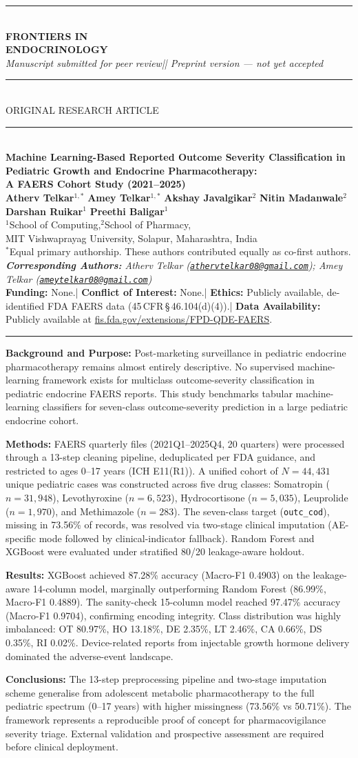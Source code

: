 \documentclass[10pt,twocolumn]{article}
\makeatletter
\newcommand{\FAERS}{\textsf{FAERS}\xspace}
\def\@maketitle{%
\newpage
\begin{center}
\leavevmode
{\color{jpbiBlue}\rule{\textwidth}{2pt}}\\[0.5pt]
{\Large\bfseries\color{jpbiBlue}
  FRONTIERS IN\\
  ENDOCRINOLOGY}\\[0pt]
{\small\itshape\color{jpbiMid}
  Manuscript submitted for peer review\enspace|\enspace
  2026\enspace|\enspace
  Preprint version --- not yet accepted}\\[0.5pt]
{\color{jpbiBlue}\rule{\textwidth}{0.5pt}}\\[0.5pt]
{\footnotesize\color{jpbiAccent}
  \MakeUppercase{Original Research Article}}\\[0.5pt]
{\color{jpbiBlue}\rule{\textwidth}{0.5pt}}\\[1pt]
{\LARGE\bfseries\color{jpbiBlue}
  Machine Learning-Based Reported Outcome Severity Classification in\\
  Pediatric Growth and Endocrine Pharmacotherapy:\\
  A FAERS Cohort Study (2021--2025)}\\[2pt]
{\small
  \textbf{Atherv Telkar}$^{1,*}$\quad
  \textbf{Amey Telkar}$^{1,*}$\quad
  \textbf{Akshay Javalgikar}$^{2}$\quad
  \textbf{Nitin Madanwale}$^{2}$\quad
  \textbf{Darshan Ruikar}$^{1}$\quad
  \textbf{Preethi Baligar}$^{1}$}\\[2pt]
{\scriptsize
  $^{1}$School of Computing,\quad $^{2}$School of Pharmacy,\\
  MIT Vishwaprayag University, Solapur, Maharashtra, India\\[0pt]
  $^{*}$Equal primary authorship. These authors contributed
  equally as co-first authors.}\\[1pt]
{\scriptsize\itshape
  \textbf{Corresponding Authors:}\enspace
  Atherv Telkar
  (\href{mailto:athervtelkar08@gmail.com}
  {\texttt{athervtelkar08@gmail.com}});\quad
  Amey Telkar
  (\href{mailto:ameytelkar08@gmail.com}
  {\texttt{ameytelkar08@gmail.com}})}\\[2pt]
{\scriptsize\color{black!80}
  \textbf{Funding:} None.\quad|\quad
  \textbf{Conflict of Interest:} None.\quad|\quad
  \textbf{Ethics:} Publicly available, de-identified FDA \FAERS data (45\,CFR\,\S\,46.104(d)(4)).\quad|\quad
  \textbf{Data Availability:} Publicly available at \href{https://fis.fda.gov/extensions/FPD-QDE-FAERS/FPD-QDE-FAERS.html}{fis.fda.gov/extensions/FPD-QDE-FAERS}.}\\[1pt]
{\color{jpbiBlue}\rule{\textwidth}{1.5pt}}
\end{center}}
\makeatother
\begin{document}
 
\onecolumn
\enlargethispage{1.5cm}
\makeatletter\@maketitle\makeatother
 
\begin{tcolorbox}[absbox, title={Structured Abstract}, colbacktitle=jpbiBlue!8, coltitle=jpbiBlue, fonttitle=\small\bfseries\centering\MakeUppercase, toptitle=2pt, bottomtitle=2pt, top=1.5pt, bottom=1.5pt]
\footnotesize
\noindent\textbf{Background and Purpose:}
Post-marketing surveillance in pediatric endocrine pharmacotherapy remains almost entirely descriptive. No supervised machine-learning framework exists for multiclass outcome-severity classification in pediatric endocrine \FAERS reports. This study benchmarks tabular machine-learning classifiers for seven-class outcome-severity prediction in a large pediatric endocrine cohort.

\par\vspace{1.5pt}\noindent\textbf{Methods:}
\FAERS quarterly files (2021Q1--2025Q4, 20 quarters) were processed through a 13-step cleaning pipeline, deduplicated per FDA guidance, and restricted to ages 0--17 years (ICH E11(R1)). A unified cohort of $N = 44{,}431$ unique pediatric cases was constructed across five drug classes: Somatropin ($n = 31{,}948$), Levothyroxine ($n = 6{,}523$), Hydrocortisone ($n = 5{,}035$), Leuprolide ($n = 1{,}970$), and Methimazole ($n = 283$). The seven-class target (\texttt{outc\_cod}), missing in 73.56\% of records, was resolved via two-stage clinical imputation (AE-specific mode followed by clinical-indicator fallback). Random Forest and XGBoost were evaluated under stratified 80/20 leakage-aware holdout.

\par\vspace{1.5pt}\noindent\textbf{Results:}
XGBoost achieved 87.28\% accuracy (Macro-F1 0.4903) on the leakage-aware 14-column model, marginally outperforming Random Forest (86.99\%, Macro-F1 0.4889). The sanity-check 15-column model reached 97.47\% accuracy (Macro-F1 0.9704), confirming encoding integrity. Class distribution was highly imbalanced: OT 80.97\%, HO 13.18\%, DE 2.35\%, LT 2.46\%, CA 0.66\%, DS 0.35\%, RI 0.02\%. Device-related reports from injectable growth hormone delivery dominated the adverse-event landscape.

\par\vspace{1.5pt}\noindent\textbf{Conclusions:}
The 13-step preprocessing pipeline and two-stage imputation scheme generalise from adolescent metabolic pharmacotherapy to the full pediatric spectrum (0--17 years) with higher missingness (73.56\% vs 50.71\%). The framework represents a reproducible proof of concept for pharmacovigilance severity triage. External validation and prospective assessment are required before clinical deployment.


\end{tcolorbox}
\end{document}
